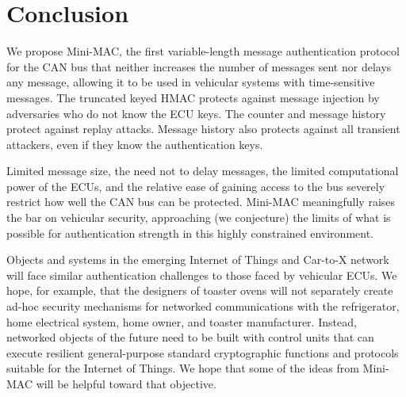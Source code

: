 \section{Conclusion}
\label{conclude}

We propose Mini-MAC, the first variable-length message authentication
protocol for the CAN bus that neither increases the number of messages sent
nor delays any message,
allowing it to be used in vehicular systems with time-sensitive messages.  
The truncated keyed HMAC protects against
message injection by adversaries who do not know the ECU keys.  
The counter and message history protect against replay attacks.  
Message history also protects against all transient attackers, even if they know the authentication keys.

Limited message size, the need not to delay messages, the limited computational power of the ECUs,
and the relative ease of gaining access to the bus severely restrict how well the CAN bus can be protected.  
Mini-MAC meaningfully raises the bar on vehicular security,
approaching (we conjecture) the limits of what is possible for authentication strength in this highly
constrained environment.

Objects and systems in the emerging Internet of Things and Car-to-X network
will face similar authentication challenges to those faced by 
vehicular ECUs.  We hope, for example, that the designers of toaster ovens will not
separately create ad-hoc security mechanisms for networked communications with
the refrigerator, home electrical system, home owner, and toaster manufacturer.
Instead, networked objects of the future need to be built with 
control units that can execute resilient general-purpose standard cryptographic 
functions and protocols suitable for the Internet of Things.  We hope that some
of the ideas from Mini-MAC will be helpful toward that objective.



